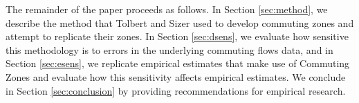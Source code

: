The remainder of the paper proceeds as follows. In Section \ref{sec:method}, we describe the method that Tolbert and Sizer used to develop commuting zones and attempt to replicate their zones. In Section \ref{sec:dsens}, we evaluate how sensitive this methodology is to errors in the underlying commuting flows data, and in Section \ref{sec:esens}, we replicate empirical estimates that make use of Commuting Zones and evaluate how this sensitivity affects empirical estimates. We conclude in Section \ref{sec:conclusion} by providing recommendations for empirical research.
